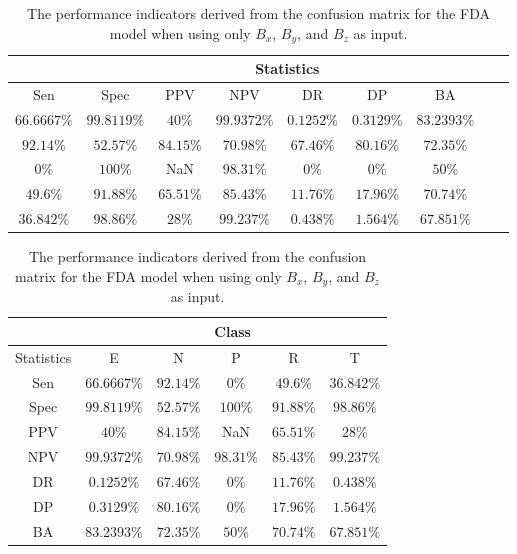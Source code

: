 \begin{table}[!ht]
	\centering
	\begin{tabular}{|c|c|c|c|c|c|c|c|c|}
		\hline
		 & \multicolumn{7}{c|}{Statistics} \\ \hline
		Sen & Spec & PPV & NPV & DR & DP & BA \\ \hline
		$66.6667\%$ & $99.8119\%$ & $40\%$ & $99.9372\%$ & $0.1252\%$ & $0.3129\%$ & $83.2393\%$ \\ \hline
		$92.14\%$ & $52.57\%$ & $84.15\%$ & $70.98\%$ & $67.46\%$ & $80.16\%$ & $72.35\%$ \\ \hline
		$0\%$ & $100\%$ & NaN & $98.31\%$ & $0\%$ & $0\%$ & $50\%$ \\ \hline
		$49.6\%$ & $91.88\%$ & $65.51\%$ & $85.43\%$ & $11.76\%$ & $17.96\%$ & $70.74\%$ \\ \hline
		$36.842\%$ & $98.86\%$ & $28\%$ & $99.237\%$ & $0.438\%$ & $1.564\%$ & $67.851\%$ \\ \hline
	\end{tabular}
	\caption{The performance indicators derived from the confusion matrix for the FDA model when using only $B_{x}$, $B_{y}$, and $B_{z}$ as input.}
	\label{tab:cs:coord:fda}
\end{table}

\begin{table}[!ht]
	\centering
	\begin{tabular}{|c|c|c|c|c|c|}
		\hline
		 & \multicolumn{5}{c|}{Class} \\ \hline
		Statistics & E & N & P & R & T \\ \hline
		Sen & $66.6667\%$ & $92.14\%$ & $0\%$ & $49.6\%$ & $36.842\%$ \\ \hline
		Spec & $99.8119\%$ & $52.57\%$ & $100\%$ & $91.88\%$ & $98.86\%$ \\ \hline
		PPV & $40\%$ & $84.15\%$ & NaN & $65.51\%$ & $28\%$ \\ \hline
		NPV & $99.9372\%$ & $70.98\%$ & $98.31\%$ & $85.43\%$ & $99.237\%$ \\ \hline
		DR & $0.1252\%$ & $67.46\%$ & $0\%$ & $11.76\%$ & $0.438\%$ \\ \hline
		DP & $0.3129\%$ & $80.16\%$ & $0\%$ & $17.96\%$ & $1.564\%$ \\ \hline
		BA & $83.2393\%$ & $72.35\%$ & $50\%$ & $70.74\%$ & $67.851\%$ \\ \hline
	\end{tabular}
	\caption{The performance indicators derived from the confusion matrix for the FDA model when using only $B_{x}$, $B_{y}$, and $B_{z}$ as input.}
	\label{tab:cs:reverse:coord:fda}
\end{table}

